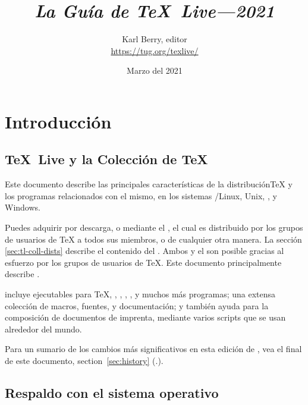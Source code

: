 \documentclass{article}
\begin{document}
\title{%
{\huge \textit{La Guía de \TeX\ Live---2021}}}

\author{Karl Berry, editor \\[3mm]
        \url{https://tug.org/texlive/}}

\date{Marzo del 2021}

\maketitle

\begin{multicols}{2}
\tableofcontents
\end{multicols}

\section{Introducción}
\label{sec:intro}

\subsection{\TeX\ Live y la Colección de \TeX\ }


Este documento describe las principales características de la
distribución\Dash \TeX{} y los programas relacionados con el mismo, en
los sistemas \GNU/Linux, Unix, \MacOSX, y Windows.

Puedes adquirir \TL{} por descarga, o mediante el \TK{} \DVD, el
cual es distribuido por los grupos de usuarios de \TeX{} a todos sus
miembros, o de cualquier otra manera. La sección
\ref{sec:tl-coll-dists} describe el contenido del \DVD. Ambos \TL{} y
el \TK{} son posible gracias al esfuerzo por los grupos de usuarios de
\TeX{}. Este documento principalmente describe \TL{}.

\TL{} incluye ejecutables para \TeX{}, \LaTeXe{}, \ConTeXt, \MF, \MP,
\BibTeX{} y muchos más programas; una extensa colección de macros,
fuentes, y documentación; y también ayuda para la composición de
documentos de imprenta, mediante varios scripts que se usan alrededor
del mundo.

Para un sumario de los cambios más significativos en esta edición de
\TL{}, vea el final de este documento, section~\ref{sec:history}
(\p.\pageref{sec:history}).

\subsection{Respaldo con el sistema operativo}
\label{sec:os-support}
\end{document}
